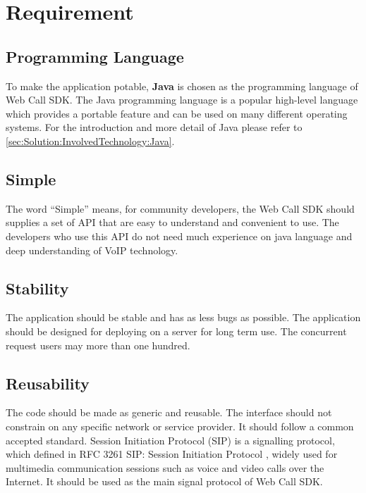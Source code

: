 \chapter{Requirement}
\label{sec:Requirement}


\section{Programming Language}
\label{sec:Requirement:ProgrammingLanguage}

To make the application potable, \textbf{Java} is chosen as the programming language of Web Call SDK. The Java programming language is a popular high-level language which provides a portable feature and can be used on many different operating systems. For the introduction and more detail of Java please refer to \ref{sec:Solution:InvolvedTechnology:Java}.

\section{Simple}
\label{sec:Requirement:Simple}

The word ``Simple'' means, for community developers, the Web Call SDK should supplies a set of API that are easy to understand and convenient to use. The developers who use this API do not need much experience on java language and deep understanding of VoIP technology.

\section{Stability}
\label{sec:Requirement:Stability}

The application should be stable and has as less bugs as possible. The application should be designed for deploying on a server for long term use. The concurrent request users may more than one hundred. 

\section{Reusability}
\label{sec:Requirement:Reusability}

The code should be made as generic and reusable. The interface should not constrain on any specific network or service provider. It should follow a common accepted standard. Session Initiation Protocol (SIP) is a signalling protocol, which defined in RFC 3261 SIP: Session Initiation Protocol \cite{RFC3261}, widely used for multimedia communication sessions such as voice and video calls over the Internet. It should be used as the main signal protocol of Web Call SDK.

